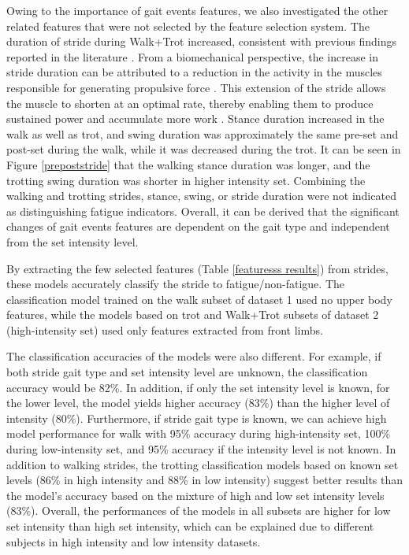 Owing to the importance of gait events features, we also investigated the other related features that were not selected by the feature selection system. The duration of stride during Walk+Trot increased, consistent with previous findings reported in the literature \cite{Cottin2006EffectTraining,Colborne2001ElectromyographicStudy.,Williams2018ElectromyographyTechnology, Pugliese2020EffectStudy,parkes_2019_the}. From a biomechanical perspective, the increase in stride duration can be attributed to a reduction in the activity in the muscles responsible for generating propulsive force \cite{Takahashi2021EffectsRaces}. This extension of the stride allows the muscle to shorten at an optimal rate, thereby enabling them to produce sustained power and accumulate more work \cite{wickler_2006_stride,johnston}. Stance duration increased in the walk as well as trot, and swing duration was approximately the same pre-\gls{set} and post-\gls{set} during the walk, while it was decreased during the trot. It can be seen in Figure \ref{prepoststride} that the walking stance duration was longer, and the trotting swing duration was shorter in higher intensity \gls{set}. Combining the walking and trotting strides, stance, swing, or stride duration were not indicated as distinguishing fatigue indicators. Overall, it can be derived that the significant changes of gait events features are dependent on the gait type and independent from the \gls{set} intensity level.


By extracting the few selected features (Table \ref{featuresss results}) from strides, these models accurately classify the stride to fatigue/non-fatigue. The classification model trained on the walk subset of dataset 1 used no upper body features, while the models based on trot and Walk+Trot subsets of dataset 2 (high-intensity \gls{set}) used only features extracted from front limbs. 

The classification accuracies of the models were also different. For example, if both stride gait type and \gls{set} intensity level are unknown, the classification accuracy would be 82\%. In addition, if only the \gls{set} intensity level is known, for the lower level, the model yields higher accuracy (83\%) than the higher level of intensity (80\%). Furthermore, if stride gait type is known, we can achieve high model performance for walk with 95\% accuracy during high-intensity \gls{set}, 100\% during low-intensity \gls{set}, and 95\% accuracy if the intensity level is not known. In addition to walking strides, the trotting classification models based on known \gls{set} levels (86\% in high intensity and 88\% in low intensity) suggest better results than the model's accuracy based on the mixture of high and low \gls{set} intensity levels (83\%). Overall, the performances of the models in all subsets are higher for low \gls{set} intensity than high \gls{set} intensity, which can be explained due to different subjects in high intensity and low intensity datasets.

